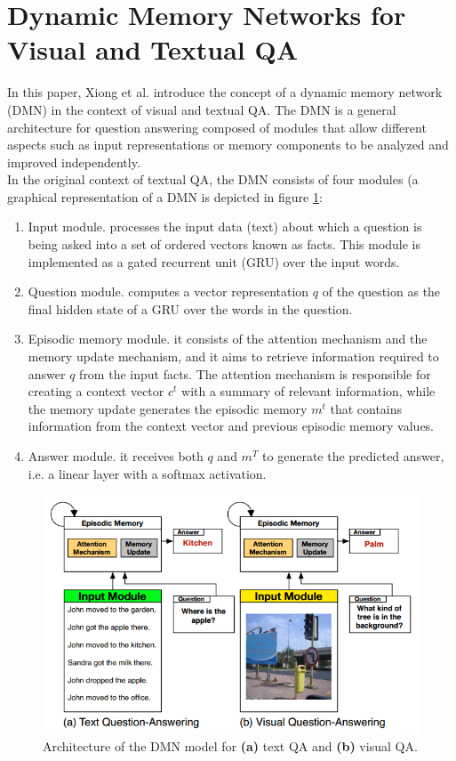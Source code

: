 \documentclass{article}
\begin{document}
\section{Dynamic Memory Networks for Visual and Textual QA}
In this paper, Xiong et al. \citep{corrXiong16} introduce the concept of a dynamic memory network (DMN) in the context of visual and textual QA. The DMN is a general architecture for question answering composed of  modules that allow different aspects such as input representations or memory components to be analyzed and improved independently.\\
In the original context of textual QA, the DMN consists of four modules (a graphical representation of a DMN is depicted in figure \ref{dmnArch}:
\begin{enumerate}
    \item Input module. processes the input data (text) about which a question is being asked into a set of ordered vectors known as facts. This module is implemented as a gated recurrent unit (GRU) over the input words.
    \item Question module. computes a vector representation $q$ of the question as the final hidden state of a GRU over the words in the question.
    \item Episodic memory module. it consists of the attention mechanism and the memory update mechanism, and it aims to retrieve information required to answer $q$ from the input facts. The attention mechanism is responsible for creating a context vector $c^t$ with a summary of relevant information, while the memory update generates the episodic memory $m^t$ that contains information from the context vector and previous episodic memory values.
    \item Answer module. it receives both $q$ and $m^T$ to generate the predicted answer, i.e. a linear layer with a softmax activation.
\end{enumerate}

    \begin{figure}[ht]
    	\centering
            \includegraphics[width=0.75\linewidth]{dmnArch.PNG}
    	\caption{Architecture of the DMN model for \textbf{(a)} text QA and \textbf{(b)} visual QA.}
    	\label{dmnArch}
    \end{figure}
\end{document}
